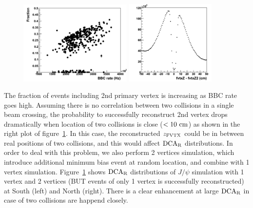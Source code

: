 \documentclass[12pt]{article}
\newcommand{\jpsi}{$J/\psi$ }
\newcommand{\dcar}{$\rm{DCA}_{R}$ }
\newcommand{\fvtxz}{$z_{\rm FVTX}$ }
\begin{document}
\begin{figure}[h]
\begin{center}
\includegraphics[width=0.5\textwidth,angle=0]{figures/Fraction_2nd_vertex_BBCrate}
\includegraphics[width=0.4\textwidth,angle=0]{figures/FvtxZ_diff_1st_2nd}
\\ \caption{}
\label{fig:FvtxZ_2nd}
\end{center}
\end{figure}


The fraction of events including 2nd primary vertex is increasing as BBC rate goes high.
Assuming there is no correlation between two collisions in a single beam crossing, the probability to successfully reconstruct 2nd vertex drops dramatically when location of two collisions is close ($<10~{\rm cm}$) as shown in the right plot of figure~\ref{fig:FvtxZ_2nd}.
In this case, the reconstructed \fvtxz could be in between real positions of two collisions, and this would affect \dcar distributions.
In order to deal with this problem, we also perform 2 vertices simulation, which introduce additional minimum bias event at random location, and combine with 1 vertex simulation.
Figure~\ref{fig:FvtxZ_2nd} shows \dcar distributions of \jpsi simulation with 1 vertex and 2 vertices (BUT events of only 1 vertex is successfully reconstructed) at South (left) and North (right).
There is a clear enhancement at large \dcar in case of two collisions are happend closely.
\end{document}
